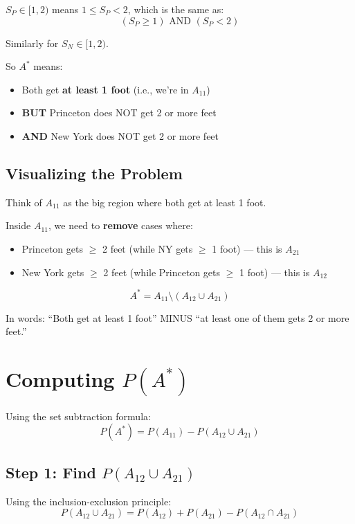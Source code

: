 \documentclass[11pt]{article}
\begin{document}
$S_P \in [1,2)$ means $1 \leq S_P < 2$, which is the same as:
\[
(S_P \geq 1) \text{ AND } (S_P < 2)
\]

Similarly for $S_N \in [1,2)$.

So $A^*$ means:
\begin{itemize}
    \item Both get \textbf{at least 1 foot} (i.e., we're in $A_{11}$)
    \item \textbf{BUT} Princeton does NOT get 2 or more feet
    \item \textbf{AND} New York does NOT get 2 or more feet
\end{itemize}

\subsection*{Visualizing the Problem}

Think of $A_{11}$ as the big region where both get at least 1 foot.

Inside $A_{11}$, we need to \textbf{remove} cases where:
\begin{itemize}
    \item Princeton gets $\geq$ 2 feet (while NY gets $\geq$ 1 foot) — this is $A_{21}$
    \item New York gets $\geq$ 2 feet (while Princeton gets $\geq$ 1 foot) — this is $A_{12}$
\end{itemize}

\begin{tcolorbox}[colback=blue!10, colframe=blue!50!black, title=The Formula]
\[
A^* = A_{11} \setminus (A_{12} \cup A_{21})
\]

In words: ``Both get at least 1 foot'' MINUS ``at least one of them gets 2 or more feet.''
\end{tcolorbox}

\section*{Computing $P(A^*)$}

Using the set subtraction formula:
\[
P(A^*) = P(A_{11}) - P(A_{12} \cup A_{21})
\]

\subsection*{Step 1: Find $P(A_{12} \cup A_{21})$}

Using the inclusion-exclusion principle:
\[
P(A_{12} \cup A_{21}) = P(A_{12}) + P(A_{21}) - P(A_{12} \cap A_{21})
\]
\end{document}

